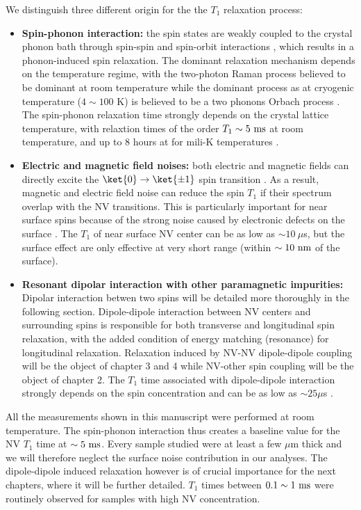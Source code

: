 \documentclass[a4paper,11pt]{report}
\begin{document}
We distinguish three different origin for the the $T_1$ relaxation process:
\begin{itemize}
\item \textbf{Spin-phonon interaction:} the spin states are weakly coupled to the crystal phonon bath through spin-spin and spin-orbit interactions \citep{norambuena2018spin}, which results in a phonon-induced spin relaxation. The dominant relaxation mechanism depends on the  temperature regime, with the two-photon Raman process believed to be dominant at room temperature \citep{takahashi2008quenching, jarmola2012temperature} while the dominant process as at cryogenic temperature ($4\sim100$ K) is believed to be a two phonons Orbach process \citep{redman1991spin, norambuena2018spin}. The spin-phonon relaxation time strongly depends on the crystal lattice temperature, with relaxtion times of the order $T_1 \sim 5\ \rm ms$ at room temperature, and up to 8 hours at for mili-K temperatures \citep{astner2018solid}.

\item \textbf{Electric and magnetic field noises:} both electric and magnetic fields can directly excite the $\ket{0} \to \ket{\pm 1}$ spin transition \citep{udvarhelyi2018spin}. As a result, magnetic and electric field noise can reduce the spin $T_1$ if their spectrum overlap with the NV transitions. This is particularly important for near surface spins because of the strong noise caused by electronic defects on the surface \citep{sangtawesin2019origins}. The $T_1$ of near surface NV center can be as low as $\sim 10\ \mu$s, but the surface effect are only effective at very short range (within $\sim 10\ \rm nm$ of the surface).

\item \textbf{Resonant dipolar interaction with other paramagnetic impurities:} Dipolar interaction betwen two spins will be detailed more thoroughly in the following section. Dipole-dipole interaction between NV centers and surrounding spins is responsible for both transverse and longitudinal spin relaxation, with the added condition of energy matching (resonance) for longitudinal relaxation. Relaxation induced by NV-NV dipole-dipole coupling will be the object of chapter 3 and 4 while NV-other spin coupling will be the object of chapter 2. The $T_1$ time associated with dipole-dipole interaction strongly depends on the spin concentration and can be as low as $\sim 25 \mu$s \citep{hall2016detection}.
\end{itemize}

All the measurements shown in this manuscript were performed at room temperature. The spin-phonon interaction thus creates a baseline value for the NV $T_1$ time at $\sim 5\ \rm ms$. Every sample studied were at least a few $\mu$m thick and we will therefore neglect the surface noise contribution in our analyses. The dipole-dipole induced relaxation however is of crucial importance for the next chapters, where it will be further detailed. $T_1$ times between $0.1 \sim 1\ \rm ms$ were routinely observed for samples with high NV concentration.
\end{document}
